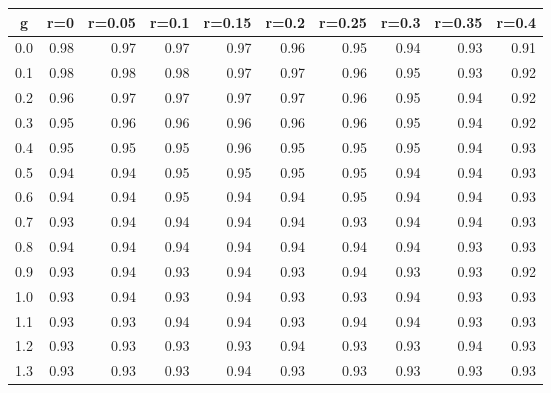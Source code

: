 %
\begin{table}[!tbp]
 \begin{center}
 \begin{tabular}{rrrrrrrrrr}\hline\hline
\multicolumn{1}{c}{g}&\multicolumn{1}{c}{r=0}&\multicolumn{1}{c}{r=0.05}&\multicolumn{1}{c}{r=0.1}&\multicolumn{1}{c}{r=0.15}&\multicolumn{1}{c}{r=0.2}&\multicolumn{1}{c}{r=0.25}&\multicolumn{1}{c}{r=0.3}&\multicolumn{1}{c}{r=0.35}&\multicolumn{1}{c}{r=0.4}\tabularnewline
\hline
0.0&0.98&0.97&0.97&0.97&0.96&0.95&0.94&0.93&0.91\tabularnewline
0.1&0.98&0.98&0.98&0.97&0.97&0.96&0.95&0.93&0.92\tabularnewline
0.2&0.96&0.97&0.97&0.97&0.97&0.96&0.95&0.94&0.92\tabularnewline
0.3&0.95&0.96&0.96&0.96&0.96&0.96&0.95&0.94&0.92\tabularnewline
0.4&0.95&0.95&0.95&0.96&0.95&0.95&0.95&0.94&0.93\tabularnewline
0.5&0.94&0.94&0.95&0.95&0.95&0.95&0.94&0.94&0.93\tabularnewline
0.6&0.94&0.94&0.95&0.94&0.94&0.95&0.94&0.94&0.93\tabularnewline
0.7&0.93&0.94&0.94&0.94&0.94&0.93&0.94&0.94&0.93\tabularnewline
0.8&0.94&0.94&0.94&0.94&0.94&0.94&0.94&0.93&0.93\tabularnewline
0.9&0.93&0.94&0.93&0.94&0.93&0.94&0.93&0.93&0.92\tabularnewline
1.0&0.93&0.94&0.93&0.94&0.93&0.93&0.94&0.93&0.93\tabularnewline
1.1&0.93&0.93&0.94&0.94&0.93&0.94&0.94&0.93&0.93\tabularnewline
1.2&0.93&0.93&0.93&0.93&0.94&0.93&0.93&0.94&0.93\tabularnewline
1.3&0.93&0.93&0.93&0.94&0.93&0.93&0.93&0.93&0.93\tabularnewline
\hline
\end{tabular}

\end{center}

\end{table}

